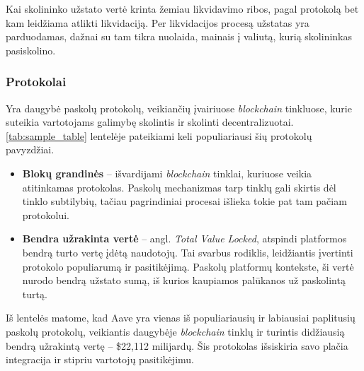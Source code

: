 \documentclass[]{VUMIFTemplateClass}
\begin{document}
Kai skolininko užstato vertė krinta žemiau likvidavimo ribos, pagal protokolą bet kam leidžiama atlikti likvidaciją. Per likvidacijos procesą užstatas yra parduodamas, dažnai su tam tikra nuolaida, mainais į valiutą, kurią skolininkas pasiskolino. \cite{venussavokosbendras}

\subsubsection{Protokolai}

Yra daugybė paskolų protokolų, veikiančių įvairiuose \textit{blockchain} tinkluose, kurie suteikia vartotojams galimybę skolintis ir skolinti decentralizuotai. \ref{tab:sample_table} lentelėje pateikiami keli populiariausi šių protokolų pavyzdžiai. 

\begin{itemize}
  \item \textbf{Blokų grandinės} – išvardijami \textit{blockchain} tinklai, kuriuose veikia atitinkamas protokolas. Paskolų mechanizmas tarp tinklų gali skirtis dėl tinklo subtilybių, tačiau pagrindiniai procesai išlieka tokie pat tam pačiam protokolui.
  \item \textbf{Bendra užrakinta vertė} – angl. \textit{Total Value Locked}, atspindi platformos bendrą turto vertę įdėtą naudotojų. Tai svarbus rodiklis, leidžiantis įvertinti protokolo populiarumą ir pasitikėjimą. Paskolų platformų kontekste, ši vertė nurodo bendrą užstato sumą, iš kurios kaupiamos palūkanos už paskolintą turtą.
  \end{itemize}
  
Iš lentelės matome, kad Aave yra vienas iš populiariausių ir labiausiai paplitusių paskolų protokolų, veikiantis daugybėje \textit{blockchain} tinklų ir turintis didžiausią bendrą užrakintą vertę – \$22,112 milijardų. Šis protokolas išsiskiria savo plačia integracija ir stipriu vartotojų pasitikėjimu.
\end{document}
